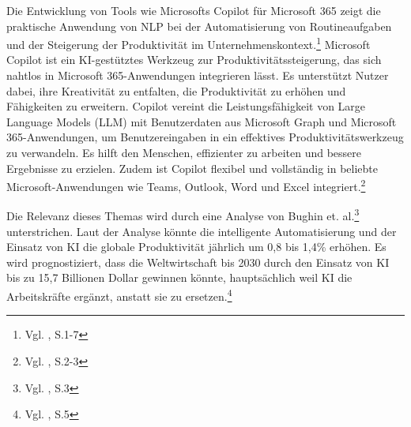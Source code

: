Die Entwicklung von Tools wie Microsofts Copilot für Microsoft 365 zeigt die praktische Anwendung von NLP bei der Automatisierung von Routineaufgaben und der Steigerung der Produktivität im Unternehmenskontext.\footnote{Vgl. \cite{Spataro2024}, S.1-7} Microsoft Copilot ist ein KI-gestütztes Werkzeug zur Produktivitätssteigerung, das sich nahtlos in Microsoft 365-Anwendungen integrieren lässt. Es unterstützt Nutzer dabei, ihre Kreativität zu entfalten, die Produktivität zu erhöhen und Fähigkeiten zu erweitern. Copilot vereint die Leistungsfähigkeit von Large Language Models (LLM) mit Benutzerdaten aus Microsoft Graph und Microsoft 365-Anwendungen, um Benutzereingaben in ein effektives Produktivitätswerkzeug zu verwandeln. Es hilft den Menschen, effizienter zu arbeiten und bessere Ergebnisse zu erzielen. Zudem ist Copilot flexibel und vollständig in beliebte Microsoft-Anwendungen wie Teams, Outlook, Word und Excel integriert.\footnote{Vgl. \cite{Vasilescu2024}, S.2-3}

Die Relevanz dieses Themas wird durch eine Analyse von Bughin et. al.\footnote{Vgl. \cite{Bughin2018}, S.3} unterstrichen. Laut der Analyse könnte die intelligente Automatisierung und der Einsatz von KI die globale Produktivität jährlich um 0,8 bis 1,4\% erhöhen. Es wird prognostiziert, dass die Weltwirtschaft bis 2030 durch den Einsatz von KI bis zu 15,7 Billionen Dollar gewinnen könnte, hauptsächlich weil KI die Arbeitskräfte ergänzt, anstatt sie zu ersetzen.\footnote{Vgl. \cite{PWC2017}, S.5}


\newpage